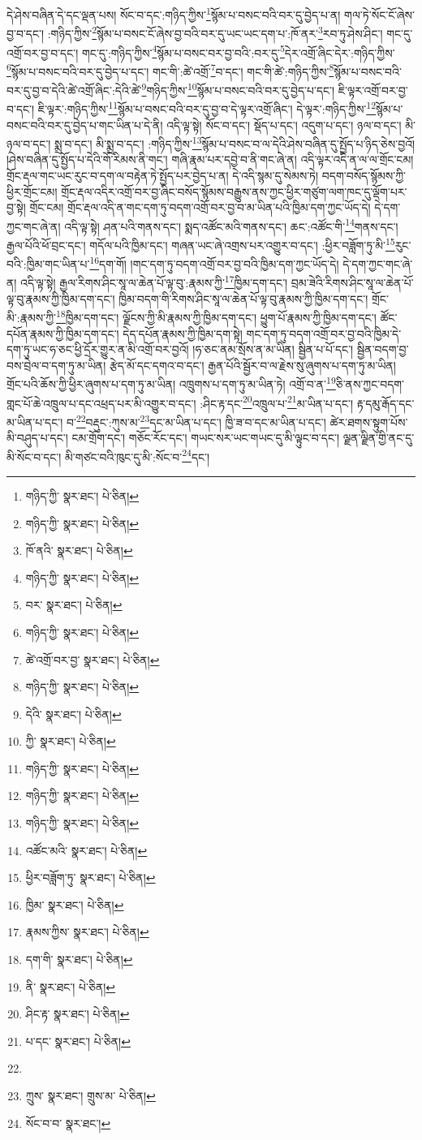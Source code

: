 དེ་ཤེས་བཞིན་དེ་དང་ལྡན་པས། སོང་བ་དང་:གཉིད་ཀྱིས་\footnote{གཉིད་ཀྱི་  སྣར་ཐང་།  པེ་ཅིན། }སྙོམ་པ་བསང་བའི་བར་དུ་བྱེད་པ་ན། གལ་ཏེ་སོང་ངོ་ཞེས་བྱ་བ་དང་། :གཉིད་ཀྱིས་\footnote{གཉིད་ཀྱི་  སྣར་ཐང་།  པེ་ཅིན། }སྙོམ་པ་བསང་ངོ་ཞེས་བྱ་བའི་བར་དུ་ཡང་ཡང་དག་པ་:ཁོ་ནར་\footnote{ཁོ་ནའི་  སྣར་ཐང་།  པེ་ཅིན། }རབ་ཏུ་ཤེས་ཤིང་། གང་དུ་འགྲོ་བར་བྱ་བ་དང་། གང་དུ་:གཉིད་ཀྱིས་\footnote{གཉིད་ཀྱི་  སྣར་ཐང་།  པེ་ཅིན། }སྙོམ་པ་བསང་བར་བྱ་བའི་:བར་དུ་\footnote{བར་  སྣར་ཐང་།  པེ་ཅིན། }དེར་འགྲོ་ཞིང་དེར་:གཉིད་ཀྱིས་\footnote{གཉིད་ཀྱི་  སྣར་ཐང་།  པེ་ཅིན། }སྙོམ་པ་བསང་བའི་བར་དུ་བྱེད་པ་དང་། གང་གི་:ཚེ་འགྲོ་\footnote{ཚེ་འགྲོ་བར་བྱ་  སྣར་ཐང་།  པེ་ཅིན། }བ་དང་། གང་གི་ཚེ་:གཉིད་ཀྱིས་\footnote{གཉིད་ཀྱི་  སྣར་ཐང་།  པེ་ཅིན། }སྙོམ་པ་བསང་བའི་བར་དུ་བྱ་བ་དེའི་ཚེ་འགྲོ་ཞིང་:དེའི་ཚེ་\footnote{དེའི་  སྣར་ཐང་།  པེ་ཅིན། }གཉིད་ཀྱིས་\footnote{ཀྱི་  སྣར་ཐང་།  པེ་ཅིན། }སྙོམ་པ་བསང་བའི་བར་དུ་བྱེད་པ་དང་། ཇི་ལྟར་འགྲོ་བར་བྱ་བ་དང་། ཇི་ལྟར་:གཉིད་ཀྱིས་\footnote{གཉིད་ཀྱི་  སྣར་ཐང་།  པེ་ཅིན། }སྙོམ་པ་བསང་བའི་བར་དུ་བྱ་བ་དེ་ལྟར་འགྲོ་ཞིང་། དེ་ལྟར་:གཉིད་ཀྱིས་\footnote{གཉིད་ཀྱི་  སྣར་ཐང་།  པེ་ཅིན། }སྙོམ་པ་བསང་བའི་བར་དུ་བྱེད་པ་གང་ཡིན་པ་དེ་ནི། འདི་ལྟ་སྟེ། སོང་བ་དང་། སྡོད་པ་དང་། འདུག་པ་དང་། ཉལ་བ་དང་། མི་ཉལ་བ་དང་། སྨྲ་བ་དང་། མི་སྨྲ་བ་དང་། :གཉིད་ཀྱིས་\footnote{གཉིད་ཀྱི་  སྣར་ཐང་།  པེ་ཅིན། }སྙོམ་པ་བསང་བ་ལ་དེའི་ཤེས་བཞིན་དུ་སྤྱོད་པ་ཉིད་ཅེས་བྱའོ། །ཤེས་བཞིན་དུ་སྤྱོད་པ་དེའི་གོ་རིམས་ནི་གང་། གཞི་རྣམ་པར་དབྱེ་བ་ནི་གང་ཞེ་ན། འདི་ལྟར་འདི་ན་ལ་ལ་གྲོང་ངམ། གྲོང་རྡལ་གང་ཡང་རུང་བ་དག་ལ་བརྟེན་ཏེ་སྤྱོད་པར་བྱེད་པ་ན། དེ་འདི་སྙམ་དུ་སེམས་ཏེ། བདག་བསོད་སྙོམས་ཀྱི་ཕྱིར་གྲོང་ངམ། གྲོང་རྡལ་འདིར་འགྲོ་བར་བྱ་ཞིང་བསོད་སྙོམས་བརྒྱུས་ནས་ཀྱང་ཕྱིར་གཙུག་ལག་ཁང་དུ་ལྡོག་པར་བྱ་སྟེ། གྲོང་ངམ། གྲོང་རྡལ་འདི་ན་གང་དག་ཏུ་བདག་འགྲོ་བར་བྱ་བ་མ་ཡིན་པའི་ཁྱིམ་དག་ཀྱང་ཡོད་དེ། དེ་དག་ཀྱང་གང་ཞེ་ན། འདི་ལྟ་སྟེ། ཤན་པའི་གནས་དང་། སྨད་འཚོང་མའི་གནས་དང་། ཆང་:འཚོང་གི་\footnote{འཚོང་མའི་  སྣར་ཐང་།  པེ་ཅིན། }གནས་དང་། རྒྱལ་པོའི་ཕོ་བྲང་དང་། གདོལ་པའི་ཁྱིམ་དང་། གཞན་ཡང་ཞེ་འགྲས་པར་འགྱུར་བ་དང་། :ཕྱིར་བཟློག་ཏུ་མི་\footnote{ཕྱིར་བཟློག་ཏུ་  སྣར་ཐང་།  པེ་ཅིན། }རུང་བའི་:ཁྱིམ་གང་ཡིན་པ་\footnote{ཁྱིམ་  སྣར་ཐང་།  པེ་ཅིན། }དག་གོ། །གང་དག་ཏུ་བདག་འགྲོ་བར་བྱ་བའི་ཁྱིམ་དག་ཀྱང་ཡོད་དེ། དེ་དག་ཀྱང་གང་ཞེ་ན། འདི་ལྟ་སྟེ། རྒྱལ་རིགས་ཤིང་སཱ་ལ་ཆེན་པོ་ལྟ་བུ་:རྣམས་ཀྱི་\footnote{རྣམས་ཀྱིས་  སྣར་ཐང་།  པེ་ཅིན། }ཁྱིམ་དག་དང་། བྲམ་ཟེའི་རིགས་ཤིང་སཱ་ལ་ཆེན་པོ་ལྟ་བུ་རྣམས་ཀྱི་ཁྱིམ་དག་དང་། ཁྱིམ་བདག་གི་རིགས་ཤིང་སཱ་ལ་ཆེན་པོ་ལྟ་བུ་རྣམས་ཀྱི་ཁྱིམ་དག་དང་། གྲོང་མི་:རྣམས་ཀྱི་\footnote{དག་གི་  སྣར་ཐང་།  པེ་ཅིན། }ཁྱིམ་དག་དང་། ལྗོངས་ཀྱི་མི་རྣམས་ཀྱི་ཁྱིམ་དག་དང་། ཕྱུག་པོ་རྣམས་ཀྱི་ཁྱིམ་དག་དང་། ཚོང་དཔོན་རྣམས་ཀྱི་ཁྱིམ་དག་དང་། དེད་དཔོན་རྣམས་ཀྱི་ཁྱིམ་དག་སྟེ། གང་དག་ཏུ་བདག་འགྲོ་བར་བྱ་བའི་ཁྱིམ་དེ་དག་ཏུ་ཡང་ཧ་ཅང་ཕྱི་དྲོར་གྱུར་ན་མི་འགྲོ་བར་བྱའོ། །ཧ་ཅང་ནམ་སྲོས་ན་མ་ཡིན། སྦྱིན་པ་པོ་དང་། སྦྱིན་བདག་བྱ་བས་བྲེལ་བ་དག་ཏུ་མ་ཡིན། རྩེད་མོ་དང་དགའ་བ་དང་། རྒྱན་པོའི་སྦྱོར་བ་ལ་རྗེས་སུ་ཞུགས་པ་དག་ཏུ་མ་ཡིན། གྲོང་པའི་ཆོས་ཀྱི་ཕྱིར་ཞུགས་པ་དག་ཏུ་མ་ཡིན། འཁྲུགས་པ་དག་ཏུ་མ་ཡིན་ཏེ། འགྲོ་བ་ན་\footnote{ནི་  སྣར་ཐང་།  པེ་ཅིན། }ཅི་ནས་ཀྱང་བདག་གླང་པོ་ཆེ་འཁྲུལ་པ་དང་འཕྲད་པར་མི་འགྱུར་བ་དང་། :ཤིང་རྟ་དང་\footnote{ཤིང་རྟ་  སྣར་ཐང་།  པེ་ཅིན། }འཁྲུལ་པ་\footnote{པ་དང་  སྣར་ཐང་།  པེ་ཅིན། }མ་ཡིན་པ་དང་། རྟ་དམུ་རྒོད་དང་མ་ཡིན་པ་དང་། བ་\footnote{}བརྡུང་:ཀུས་མ་\footnote{ཀྲུས་  སྣར་ཐང་། གྲུས་མ་  པེ་ཅིན། }དང་མ་ཡིན་པ་དང་། ཁྱི་ཟ་བ་དང་མ་ཡིན་པ་དང་། ཚེར་ཐགས་སྟུག་པོས་མི་བཤུད་པ་དང་། ངམ་གྲོག་དང་། གཅོང་རོང་དང་། གཡང་སར་ཡང་གཡང་དུ་མི་ལྟུང་བ་དང་། ལྗན་ལྗིན་གྱི་ནང་དུ་མི་སོང་བ་དང་། མི་གཙང་བའི་ཁུང་དུ་མི་:སོང་བ་\footnote{སོང་བ་བ་  སྣར་ཐང་། }དང་། 